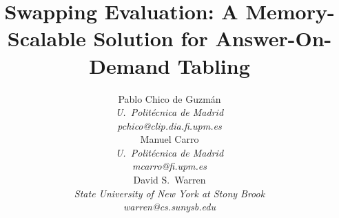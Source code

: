 \documentclass{./tlp}
\begin{document}
 
 
 
\long{} 
 
 
\title[Memory-Scalable Answer-On-Demand Tabling]{Swapping
  Evaluation: A Memory-Scalable Solution for Answer-On-Demand Tabling}
 
\author[P. Chico de Guzm\'an et al.]{ 
\begin{minipage}{0.3\linewidth}
\centering
Pablo Chico de Guzm\'an\\ 
\footnotesize
\emph{U.\ Polit\'ecnica de Madrid} \\ 
\emph{pchico@clip.dia.fi.upm.es} 
  \end{minipage}
\hfill
  \begin{minipage}{0.3\linewidth}
\centering
Manuel Carro\\ 
\footnotesize
\emph{U.\ Polit\'ecnica de Madrid} \\ 
\emph{mcarro@fi.upm.es}
  \end{minipage}
\hfill
\begin{minipage}{0.4\linewidth}
\centering
David S.\ Warren \\ 
\footnotesize
\emph{State University of New York at Stony Brook}\\ 
\emph{warren@cs.sunysb.edu}
\end{minipage}
} 
 


 
\pagerange{\pageref{firstpage}--\pageref{lastpage}} 


\maketitle 
 
\label{firstpage} 
 
\end{document}
